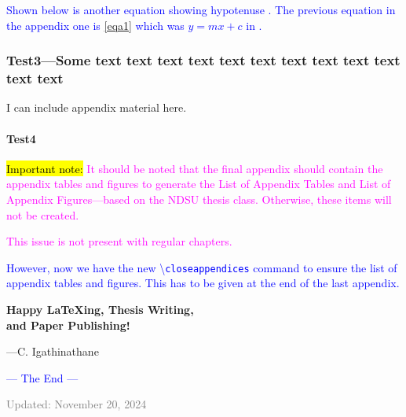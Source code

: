 \documentclass[phd]{ndsu-thesis-2022}
\newcommand\italk[1]{\textcolor{blue}{#1}}  %
\newcommand\cmd[1]{\textbackslash\texttt{#1}}  %
\begin{document}
\italk{Shown below is another equation showing hypotenuse \Cref{eqc1}. The previous equation in the appendix one is \cref{eqa1} which was $y = mx + c$ in \cpageref{eqa1}. } 
 

\subsubsection{Test3---Some text text text text text text text text text text text text}
I can include appendix material here. 

\paragraph{Test4}

{\hl{Important note:}
\textcolor{magenta}{It should be noted that the final appendix should contain the appendix tables and figures to generate the List of Appendix Tables and List of Appendix Figures---based on the NDSU thesis class. Otherwise, these items will not be created.}
} 

\textcolor{magenta}{This issue is not present with regular chapters.}

\italk{However, now we have the new \cmd{closeappendices} command to ensure the list of appendix tables and figures. This has to be given at the end of the last appendix.}

\vspace{1cm}
\begin{center}
{\LARGE\bfseries
Happy {\LaTeX}ing, Thesis Writing, \\
and Paper Publishing!
}
\end{center}

\hfill {\footnotesize---C. Igathinathane}

\vspace{0.1in}
\begin{center}
\italk{--- The End ---}
\end{center}

\vfill
{\noindent\scriptsize\textcolor{gray}{Updated: November 20, 2024}}

\closeappendices  %
\end{document}
